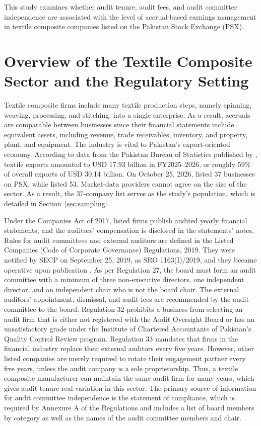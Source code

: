This study examines whether audit tenure, audit fees, and audit committee independence are associated with the level of accrual-based earnings management in textile composite companies listed on the Pakistan Stock Exchange (PSX).

\section{Overview of the Textile Composite Sector and the Regulatory Setting}

Textile composite firms include many textile production steps, namely spinning, weaving, processing, and stitching, into a single enterprise. As a result, accruals are comparable between businesses since their financial statements include equivalent assets, including revenue, trade receivables, inventory, and property, plant, and equipment. The industry is vital to Pakistan's export-oriented economy. According to data from the Pakistan Bureau of Statistics published by \textcite{profit2026}, textile exports amounted to USD 17.93 billion in FY2025--2026, or roughly 59\% of overall exports of USD 30.14 billion. On October 25, 2026, \textcite{tickeranalysts2026} listed 37 businesses on PSX, while \textcite{finhisaab2026} listed 53. Market-data providers cannot agree on the size of the sector. As a result, the 37-company list serves as the study's population, which is detailed in Section~\ref{sec:sampling}.

Under the Companies Act of 2017, listed firms publish audited yearly financial statements, and the auditors' compensation is disclosed in the statements' notes. Rules for audit committees and external auditors are defined in the Listed Companies (Code of Corporate Governance) Regulations, 2019. They were notified by SECP on September 25, 2019, as SRO 1163(I)/2019, and they became operative upon publication \parencite{secp2019}. As per Regulation 27, the board must form an audit committee with a minimum of three non-executive directors, one independent director, and an independent chair who is not the board chair. The external auditors' appointment, dismissal, and audit fees are recommended by the audit committee to the board. Regulation 32 prohibits a business from selecting an audit firm that is either not registered with the Audit Oversight Board or has an unsatisfactory grade under the Institute of Chartered Accountants of Pakistan's Quality Control Review program. Regulation 33 mandates that firms in the financial industry replace their external auditors every five years. However, other listed companies are merely required to rotate their engagement partner every five years, unless the audit company is a sole proprietorship. Thus, a textile composite manufacturer can maintain the same audit firm for many years, which gives audit tenure real variation in this sector. The primary source of information for audit committee independence is the statement of compliance, which is required by Annexure A of the Regulations and includes a list of board members by category as well as the names of the audit committee members and chair.

